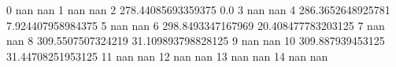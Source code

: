 0 nan nan
1 nan nan
2 278.44085693359375 0.0
3 nan nan
4 286.3652648925781 7.924407958984375
5 nan nan
6 298.8493347167969 20.408477783203125
7 nan nan
8 309.5507507324219 31.109893798828125
9 nan nan
10 309.887939453125 31.44708251953125
11 nan nan
12 nan nan
13 nan nan
14 nan nan

